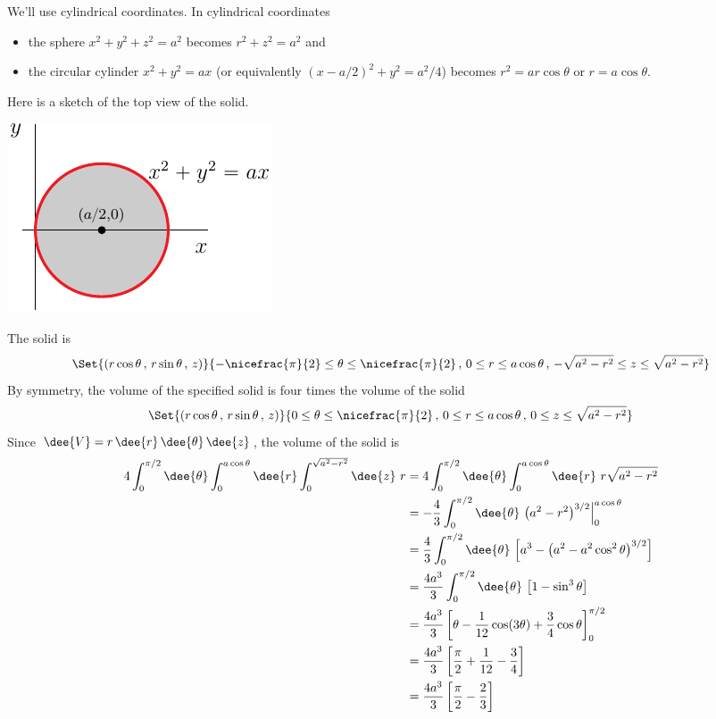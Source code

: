 \begin{solution}
We'll use cylindrical coordinates. In cylindrical coordinates 
\begin{itemize}
\item 
the sphere $x^2+y^2+z^2=a^2$ becomes $r^2+z^2=a^2$ and 
\item 
the circular cylinder  $x^2+y^2=ax$ (or equivalently $(x-a/2)^2+ y^2=a^2/4$)
becomes $r^2=ar\cos\theta$ or $r=a\cos\theta$.
\end{itemize}
Here is a sketch of the top view of the solid.

\begin{center}
     \includegraphics{fig/OE13D_7.pdf}
\end{center}

The solid is
\begin{equation*}
\Set{(r\cos\theta\,,\,r\sin\theta\,,\,z)}{
        -\nicefrac{\pi}{2}\le\theta\le\nicefrac{\pi}{2}\,,\,
        0\le r\le a\cos\theta\,,\,
        -\sqrt{a^2-r^2}\le z\le \sqrt{a^2-r^2}}
\end{equation*}
By symmetry, the volume of the specified solid is four times
the volume of the solid
\begin{equation*}
\Set{(r\cos\theta\,,\,r\sin\theta\,,\,z)}{
        0\le\theta\le\nicefrac{\pi}{2}\,,\,
        0\le r\le a\cos\theta\,,\,
        0\le z\le \sqrt{a^2-r^2}}
\end{equation*}
Since $\dee{V} = r\,\dee{r}\,\dee{\theta}\,\dee{z}$,
 the volume of the solid is
\begin{align*}
4\int_0^{\pi/2}\dee{\theta} \int_0^{a\cos\theta} \dee{r}
   \int_0^{\sqrt{a^2-r^2}}\dee{z}\ r
&=4\int_0^{\pi/2}\dee{\theta} \int_0^{a\cos\theta} \dee{r}\ 
        r\sqrt{a^2-r^2} \\
&=-\frac{4}{3}\int_0^{\pi/2}\dee{\theta}\ 
         \big(a^2-r^2\big)^{3/2}\Big|_0^{a\cos\theta} \\
&=\frac{4}{3}\int_0^{\pi/2}\dee{\theta}\ 
         \Big[a^3-\big(a^2-a^2\cos^2\theta\big)^{3/2}\Big] \\
&=\frac{4a^3}{3}\int_0^{\pi/2}\dee{\theta}\ 
         \big[1-\sin^3\theta\big] \\
&=\frac{4a^3}{3}\left[\theta - \frac{1}{12}\cos(3\theta) + \frac{3}{4}\cos\theta
           \right]_0^{\pi/2} \\
&=\frac{4a^3}{3}\left[\frac{\pi}{2} + \frac{1}{12} - \frac{3}{4} \right] \\
&=\frac{4a^3}{3}\left[\frac{\pi}{2}  - \frac{2}{3} \right]
\end{align*}
\end{solution}

